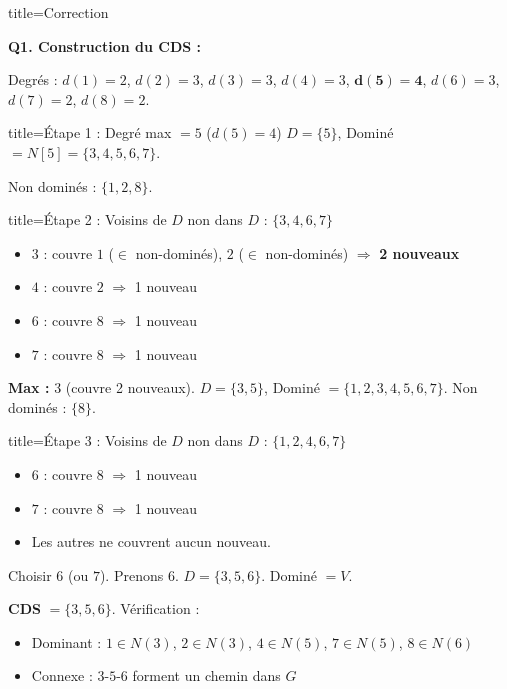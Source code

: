 \documentclass[12pt,a4paper]{article}
\begin{document}
\begin{correction}{title=Correction}

\textbf{Q1. Construction du CDS :}

Degr\'es : $d(1)=2$, $d(2)=3$, $d(3)=3$, $d(4)=3$, $\mathbf{d(5)=4}$, $d(6)=3$, $d(7)=2$, $d(8)=2$.

\begin{etape}{title=\'Etape 1 : Degr\'e max $= 5$ ($d(5)=4$)}
$D = \{5\}$, Domin\'e $= N[5] = \{3, 4, 5, 6, 7\}$.

Non domin\'es : $\{1, 2, 8\}$.
\end{etape}

\begin{etape}{title=\'Etape 2 : Voisins de $D$ non dans $D$ : $\{3, 4, 6, 7\}$}
\begin{itemize}[nosep]
    \item $3$ : couvre $1$ ($\in$ non-domin\'es), $2$ ($\in$ non-domin\'es) $\Rightarrow$ \textbf{2 nouveaux}
    \item $4$ : couvre $2$ $\Rightarrow$ 1 nouveau
    \item $6$ : couvre $8$ $\Rightarrow$ 1 nouveau
    \item $7$ : couvre $8$ $\Rightarrow$ 1 nouveau
\end{itemize}
\textbf{Max :} $3$ (couvre 2 nouveaux). $D = \{3, 5\}$, Domin\'e $= \{1,2,3,4,5,6,7\}$. Non domin\'es : $\{8\}$.
\end{etape}

\begin{etape}{title=\'Etape 3 : Voisins de $D$ non dans $D$ : $\{1, 2, 4, 6, 7\}$}
\begin{itemize}[nosep]
    \item $6$ : couvre $8$ $\Rightarrow$ 1 nouveau
    \item $7$ : couvre $8$ $\Rightarrow$ 1 nouveau
    \item Les autres ne couvrent aucun nouveau.
\end{itemize}
Choisir $6$ (ou $7$). Prenons $6$. $D = \{3, 5, 6\}$. Domin\'e $= V$. \checkmark
\end{etape}

\textbf{CDS} $= \{3, 5, 6\}$. V\'erification :
\begin{itemize}[nosep]
    \item Dominant : $1 \in N(3)$, $2 \in N(3)$, $4 \in N(5)$, $7 \in N(5)$, $8 \in N(6)$ \checkmark
    \item Connexe : $3$-$5$-$6$ forment un chemin dans $G$ \checkmark
\end{itemize}


\end{correction}
\end{document}
